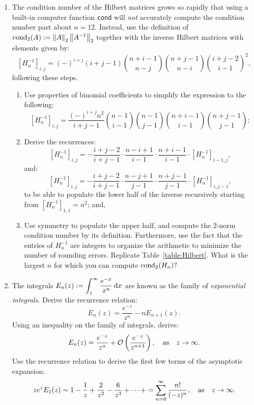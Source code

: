 \begin{enumerate}
\item The condition number of the Hilbert matrices grows so rapidly that using a built-in computer function \verb+cond+ will {\em not} accurately compute the condition number past about $n=12$. Instead, use the definition of $\operatorname{cond}_2(A) := \left\|{A}\right\|_2\left\|{A^{-1}}\right\|_2$ together with the inverse Hilbert matrices with elements given by:
\[
[H_n^{-1}]_{i,j} = (-)^{i+j}(i+j-1)\binom{n+i-1}{n-j}\binom{n+j-1}{n-i}\binom{i+j-2}{i-1}^2,
\]
following these steps.
\begin{enumerate}
\item Use properties of binomial coefficients to simplify the expression to the following:
\[
[H_n^{-1}]_{i,j} = \dfrac{(-)^{i+j}n^2}{i+j-1}\binom{n-1}{i-1}\binom{n-1}{j-1}\binom{n+i-1}{i-1}\binom{n+j-1}{j-1};
\]
\item Derive the recurrences:
\[
[H_n^{-1}]_{i,j} = -\dfrac{i+j-2}{i+j-1}\cdot\dfrac{n-i+1}{i-1}\cdot\dfrac{n+i-1}{i-1}\cdot[H_n^{-1}]_{i-1,j},
\]
and:
\[
[H_n^{-1}]_{i,j} = -\dfrac{i+j-2}{i+j-1}\cdot\dfrac{n-j+1}{j-1}\cdot\dfrac{n+j-1}{j-1}\cdot[H_n^{-1}]_{i,j-1},
\]
to be able to populate the lower half of the inverse recursively starting from $[H_n^{-1}]_{1,1} = n^2$; and,
\item Use symmetry to populate the upper half, and compute the $2$-norm condition number by its definition. Furthermore, use the fact that the entries of $H_n^{-1}$ are integers to organize the arithmetic to minimize the number of rounding errors. Replicate Table~\ref{table:Hilbert}. What is the largest $n$ for which you can compute $\operatorname{cond}_2(H_n)?$
\end{enumerate}

\item The integrals $E_n(z) := \displaystyle \int_z^\infty \dfrac{e^{-x}}{x^n}{\rm\,d} x$ are known as the family of {\em exponential integrals}. Derive the recurrence relation:
\[
E_n(z) = \dfrac{e^{-z}}{z^n} - nE_{n+1}(z).
\]
Using an inequality on the family of integrals, derive:
\[
E_n(z) = \dfrac{e^{-z}}{z^n} + \mathcal{O}\left(\dfrac{e^{-z}}{z^{n+1}}\right),\quad{\rm as}\quad z\to\infty.
\]
Use the recurrence relation to derive the first few terms of the asymptotic expansion:
\[
ze^zE_1(z) \sim 1 - \dfrac{1}{z} + \dfrac{2}{z^2} - \dfrac{6}{z^3} + \cdots + = \sum_{n=0}^\infty \dfrac{n!}{(-z)^n},\quad{\rm as}\quad z\to\infty.
\]

\end{enumerate}
